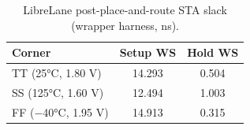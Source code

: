 \begin{table}[ht]
\centering
\caption{LibreLane post-place-and-route STA slack (wrapper harness, ns).}
\label{tbl:pvt_sta}
\begin{tabular}{@{}lcc@{}}
\toprule
Corner & Setup WS & Hold WS \\
\midrule
TT (25°C, 1.80 V) & 14.293 & 0.504 \\
SS (125°C, 1.60 V) & 12.494 & 1.003 \\
FF (−40°C, 1.95 V) & 14.913 & 0.315 \\
\bottomrule
\end{tabular}
\end{table}
